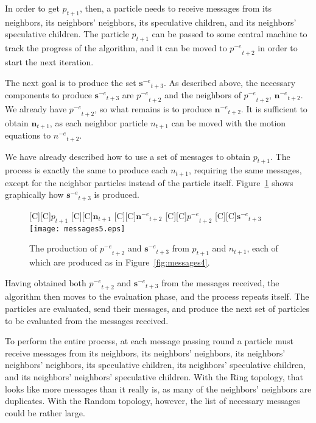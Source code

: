 \documentclass[journal,letterpaper]{IEEEtran}
\newcommand{\fig}[1]{Figure~\ref{fig:#1}}
\providecommand{\noeval}[1]{\ensuremath{#1^{-e}}}
\providecommand{\p}{\ensuremath{p}}
\providecommand{\sset}{\ensuremath{\mathbf{s}}}
\providecommand{\n}{\ensuremath{n}}
\providecommand{\nset}{\ensuremath{\mathbf{n}}}
\begin{document}
In order to get $\p_{t+1}$, then, a particle needs to receive messages from its
neighbors, its neighbors' neighbors, its speculative children, and its
neighbors' speculative children.  The particle $\p_{t+1}$ can be passed to some
central machine to track the progress of the algorithm, and it can be moved to
$\noeval{\p}_{t+2}$ in order to start the next iteration.

The next goal is to produce the set $\noeval{\sset}_{t+3}$.  As described
above, the necessary components to produce $\noeval{\sset}_{t+3}$ are
$\noeval{\p}_{t+2}$ and the neighbors of $\noeval{\p}_{t+2}$,
$\noeval{\nset}_{t+2}$.  We already have $\noeval{\p}_{t+2}$, so what remains
is to produce $\noeval{\nset}_{t+2}$.  It is sufficient to obtain
$\nset_{t+1}$, as each neighbor particle $\n_{t+1}$ can be moved with the
motion equations to $\noeval{\n}_{t+2}$.

We have already described how to use a set of messages to obtain $\p_{t+1}$.
The process is exactly the same to produce each $\n_{t+1}$, requiring the same
messages, except for the neighbor particles instead of the particle itself.  
\fig{messages5} shows graphically how $\noeval{\sset}_{t+3}$ is produced.

\begin{figure}
  \centering
  [C][C]{$\p_{t+1}$}
  [C][C]{$\nset_{t+1}$}
  [C][C]{$\noeval{\nset}_{t+2}$}
  [C][C]{$\noeval{\p}_{t+2}$}
  [C][C]{$\noeval{\sset}_{t+3}$}
  \texttt{[image: messages5.eps]}
  \caption{The production of $\noeval{\p}_{t+2}$ and $\noeval{\sset}_{t+3}$
  from $\p_{t+1}$ and $\n_{t+1}$, each of which are produced as in
  \fig{messages4}.}
  \label{fig:messages5}
\end{figure}

Having obtained both $\noeval{\p}_{t+2}$ and $\noeval{\sset}_{t+3}$ from the
messages received, the algorithm then moves to the evaluation phase, and the
process repeats itself.  The particles are evaluated, send their messages, and
produce the next set of particles to be evaluated from the messages received.

To perform the entire process, at each message passing round a particle must
receive messages from its neighbors, its neighbors' neighbors, its neighbors'
neighbors' neighbors, its speculative children, its neighbors' speculative
children, and its neighbors' neighbors' speculative children.  With the Ring
topology, that looks like more messages than it really is, as many of the
neighbors' neighbors are duplicates.  With the Random topology, however, the
list of necessary messages could be rather large.  
\end{document}
